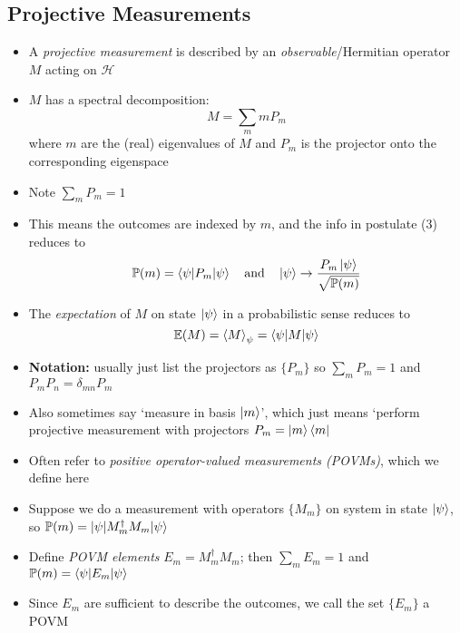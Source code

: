 \documentclass[12pt,a4paper]{article}
\numberwithin{equation}{section}
\begin{document}
	\subsection{Projective Measurements}
	\begin{itemize}
		\item A \textit{projective measurement} is described by an \textit{observable}/Hermitian operator $M$ acting on $\mathcal{H}$
		\item $M$ has a spectral decomposition:
		\begin{equation}
			M=\sum_{m}mP_{m}
		\end{equation}
		where $m$ are the (real) eigenvalues of $M$ and $P_{m}$ is the projector onto the corresponding eigenspace
		\item Note $\sum_{m}P_{m}=1$
		\item This means the outcomes are indexed by $m$, and the info in postulate (3) reduces to
		$$
			\mathbb{P}(m)=\braket{\psi|P_{m}|\psi}\quad\text{and}\quad \ket{\psi}\to\frac{P_{m}\ket{\psi}}{\sqrt{\mathbb{P}(m)}}
		$$
		\item The \textit{expectation} of $M$ on state $\ket{\psi}$ in a probabilistic sense reduces to
		\begin{equation}
			\mathbb{E}(M)=\braket{M}_{\psi}=\braket{\psi|M|\psi}
		\end{equation}
		\item \textbf{Notation:} usually just list the projectors as $\{P_{m}\}$ so $\sum_{m}P_{m}=1$ and $P_{m}P_{n}=\delta_{mn}P_{m}$
		\item Also sometimes say `measure in basis $\ket{m}$', which just means `perform projective measurement with projectors $P_{m}=\ket{m}\bra{m}$
		\item Often refer to \textit{positive operator-valued measurements (POVMs)}, which we define here
		\item Suppose we do a measurement with operators $\{M_{m}\}$ on system in state $\ket{\psi}$, so $\mathbb{P}(m)=\ket{\psi|M_{m}^{\dagger}M_{m}|\psi}$
		\item Define \textit{POVM elements} $E_{m}=M^{\dagger}_{m}M_{m}$; then $\sum_{m}E_{m}=1$ and $\mathbb{P}(m)=\braket{\psi|E_{m}|\psi}$
		\item Since $E_{m}$ are sufficient to describe the outcomes, we call the set $\{E_{m}\}$ a POVM
	\end{itemize}
\end{document}
